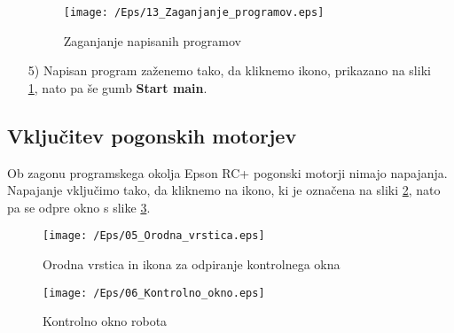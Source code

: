 \begin{enumerate}
\begin{figure}[h]
    \centering
   \texttt{[image: /Eps/13\_Zaganjanje\_programov.eps]}
    \vspace{-0.9cm}
    \caption{Zaganjanje napisanih programov}
    \label{fZaganjanjePrograma}
\end{figure}

    \item[5)] Napisan program zaženemo tako, da kliknemo ikono, prikazano na sliki \\ %
    \ref{fZaganjanjePrograma}, nato pa še gumb \textbf{Start main}.%

\end{enumerate}





\subsection{Vključitev pogonskih motorjev}

Ob zagonu programskega okolja Epson RC+ pogonski motorji nimajo
napajanja. Napajanje vključimo tako, da kliknemo na ikono, ki je
označena na sliki \ref{fOrodnaVrsticaKontrolno}, nato pa se odpre
okno s slike \ref{fOrodnaVrsticaKontrolnoOkno}.

\begin{figure}[h]
    \centering
    \texttt{[image: /Eps/05\_Orodna\_vrstica.eps]}
    \vspace{-0.9cm}
    \caption{Orodna vrstica in ikona za odpiranje kontrolnega okna}
    \label{fOrodnaVrsticaKontrolno}
\end{figure}
\vspace{-0.3cm}
\begin{figure}[h]
    \centering
    \texttt{[image: /Eps/06\_Kontrolno\_okno.eps]}
    \vspace{-0.3cm}
    \caption{Kontrolno okno robota}
    \label{fOrodnaVrsticaKontrolnoOkno}
\end{figure}


